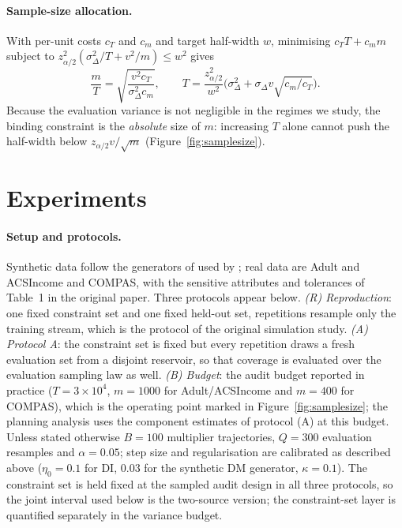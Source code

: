 \documentclass[11pt]{article}
\begin{document}
\paragraph{Sample-size allocation.}
\label{sec:ss}
With per-unit costs $c_T$ and $c_m$ and target half-width $w$, minimising $c_T T+c_m m$ subject to
$z_{\alpha/2}^2(\sigma^2_\Delta/T+v^2/m)\le w^2$ gives
\[
\frac{m}{T}=\sqrt{\frac{v^2c_T}{\sigma^2_\Delta c_m}},\qquad
T=\frac{z_{\alpha/2}^2}{w^2}\Big(\sigma^2_\Delta+\sigma_\Delta v\sqrt{c_m/c_T}\Big).
\]
Because the evaluation variance is not negligible in the regimes we study, the binding
constraint is the \emph{absolute} size of $m$: increasing $T$ alone cannot push the half-width below
$z_{\alpha/2}v/\sqrt m$ (Figure~\ref{fig:samplesize}).

\section{Experiments}
\label{sec:exp}

\paragraph{Setup and protocols.} Synthetic data follow the generators of \citet{zafar2019} used by
\citet{roy2026uq}; real data are Adult and ACSIncome \citep{ding2021} and COMPAS, with the sensitive attributes and tolerances of Table~1 in the original paper.  Three protocols appear below.
\emph{(R) Reproduction}: one fixed constraint set and one fixed held-out set, repetitions resample
only the training stream, which is the protocol of the original simulation study.
\emph{(A) Protocol A}: the constraint set is fixed but every repetition draws a fresh evaluation set
from a disjoint reservoir, so that coverage is evaluated over the evaluation sampling law as well.
\emph{(B) Budget}: the audit budget reported in practice ($T=3\times10^4$, $m=1000$ for
Adult/ACSIncome and $m=400$ for COMPAS), which is the operating point marked in
Figure~\ref{fig:samplesize}; the planning analysis uses the component estimates of protocol (A) at
this budget.  Unless stated otherwise $B=100$ multiplier trajectories, $Q=300$ evaluation resamples and $\alpha=0.05$; step size and regularisation are calibrated as
described above ($\eta_0=0.1$ for DI, $0.03$ for the synthetic DM generator, $\kappa=0.1$).  The
constraint set is held fixed at the sampled audit design in all three protocols, so the joint
interval used below is the two-source version; the constraint-set layer is quantified separately
in the variance budget.
\end{document}
